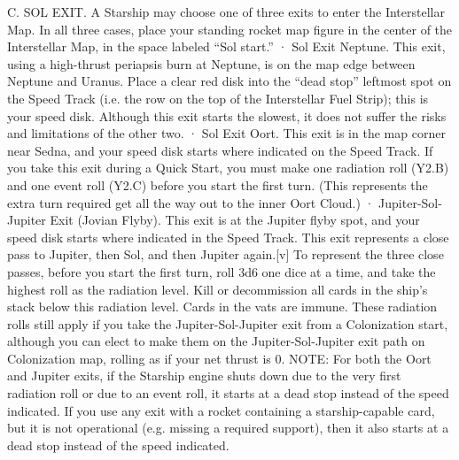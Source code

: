 \documentclass[a4paper]{book}
\begin{document}
C. SOL EXIT. A Starship may choose one of three exits to enter the Interstellar Map. In all three cases, place your standing rocket map figure in the center of the Interstellar Map, in the space labeled “Sol start.”
·       Sol Exit Neptune. This exit, using a high-thrust periapsis burn at Neptune, is on the map edge between Neptune and Uranus. Place a clear red disk into the “dead stop” leftmost spot on the Speed Track (i.e. the row on the top of the Interstellar Fuel Strip); this is your speed disk. Although this exit starts the slowest, it does not suffer the risks and limitations of the other two.
·       Sol Exit Oort. This exit is in the map corner near Sedna, and your speed disk starts where indicated on the Speed Track. If you take this exit during a Quick Start, you must make one radiation roll (Y2.B) and one event roll (Y2.C) before you start the first turn. (This represents the extra turn required get all the way out to the inner Oort Cloud.)
·       Jupiter-Sol-Jupiter Exit (Jovian Flyby). This exit is at the Jupiter flyby spot, and your speed disk starts where indicated in the Speed Track. This exit represents a close pass to Jupiter, then Sol, and then Jupiter again.[v] To represent the three close passes, before you start the first turn, roll 3d6 one dice at a time, and take the highest roll as the radiation level. Kill or decommission all cards in the ship’s stack below this radiation level. Cards in the vats are immune. These radiation rolls still apply if you take the Jupiter-Sol-Jupiter exit from a Colonization start, although you can elect to make them on the Jupiter-Sol-Jupiter exit path on Colonization map, rolling as if your net thrust is 0.
NOTE: For both the Oort and Jupiter exits, if the Starship engine shuts down due to the very first radiation roll or due to an event roll, it starts at a dead stop instead of the speed indicated. If you use any exit with a rocket containing a starship-capable card, but it is not operational (e.g. missing a required support), then it also starts at a dead stop instead of the speed indicated.
 
\end{document}
